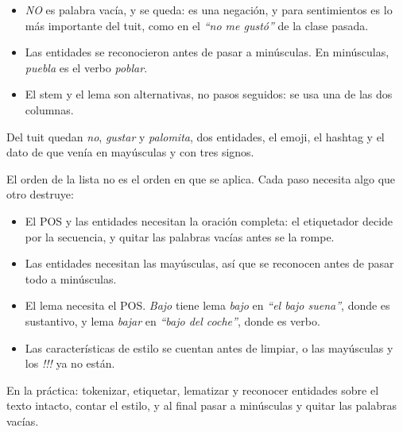 \documentclass[11pt,letterpaper]{article}
\begin{document}
\begin{ejemplo}
\begin{itemize}[itemsep=0.2em]
              cada uno, y juntó los tres signos en \textit{!!!}. Uno
              hecho para texto formal habría tirado el emoji y separado
              el \# de \textit{NuncaMás}.
        \item \textit{NO} es palabra vacía, y se queda: es una
              negación, y para sentimientos es lo más importante del
              tuit, como en el \textit{``no me gustó''} de la clase
              pasada.
        \item Las entidades se reconocieron antes de pasar a
              minúsculas. En minúsculas, \textit{puebla} es el verbo
              \textit{poblar}.
        \item El stem y el lema son alternativas, no pasos seguidos:
              se usa una de las dos columnas.
    \end{itemize}
    Del tuit quedan \textit{no}, \textit{gustar} y
    \textit{palomita}, dos entidades, el emoji, el hashtag y el dato
    de que venía en mayúsculas y con tres signos.
\end{ejemplo}

\begin{ojo}
    El orden de la lista no es el orden en que se aplica. Cada paso
    necesita algo que otro destruye:
    \begin{itemize}[itemsep=0.2em]
        \item El POS y las entidades necesitan la oración completa: el
              etiquetador decide por la secuencia, y quitar las
              palabras vacías antes se la rompe.
        \item Las entidades necesitan las mayúsculas, así que se
              reconocen antes de pasar todo a minúsculas.
        \item El lema necesita el POS. \textit{Bajo} tiene lema
              \textit{bajo} en \textit{``el bajo suena''}, donde es
              sustantivo, y lema \textit{bajar} en \textit{``bajo del
              coche''}, donde es verbo.
        \item Las características de estilo se cuentan antes de
              limpiar, o las mayúsculas y los \textit{!!!} ya no
              están.
    \end{itemize}
    En la práctica: tokenizar, etiquetar, lematizar y reconocer
    entidades sobre el texto intacto, contar el estilo, y al final
    pasar a minúsculas y quitar las palabras vacías.
\end{ojo}

\end{document}
